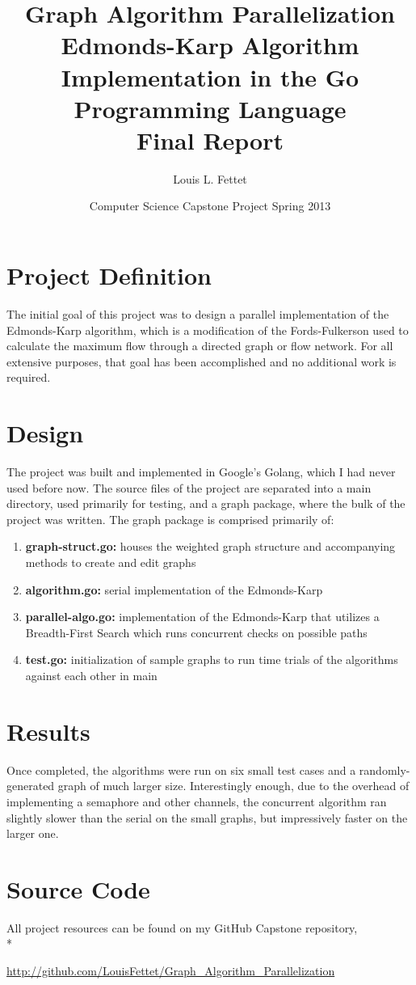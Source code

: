 \documentclass[12pt]{article}
\title{\textbf{Graph Algorithm Parallelization}\\ 
Edmonds-Karp Algorithm Implementation in the Go Programming Language\\ 
Final Report}
\date{Computer Science Capstone Project Spring 2013}
\author{Louis L. Fettet}
\begin{document}
\maketitle
\section{Project Definition}
The initial goal of this project was to design a parallel implementation of the Edmonds-Karp algorithm, which is a modification of the Fords-Fulkerson used to calculate the maximum flow through a directed graph or flow network.  For all extensive purposes, that goal has been accomplished and no additional work is required.
\section{Design}
\indent The project was built and implemented in Google's Golang, which I had never used before now.  The source files of the project are separated into a main directory, used primarily for testing, and a graph package, where the bulk of the project was written.  The graph package is comprised primarily of:
\begin {enumerate}
\item \textbf{graph-struct.go:} houses the weighted graph structure and accompanying methods to create and edit graphs
\item \textbf{algorithm.go:} serial implementation of the Edmonds-Karp
\item \textbf{parallel-algo.go:}  implementation of the Edmonds-Karp that utilizes a Breadth-First Search which runs concurrent checks on possible paths
\item \textbf{test.go:} initialization of sample graphs to run time trials of the algorithms against each other in main
\end {enumerate}
\section{Results}
\indent Once completed, the algorithms were run on six small test cases and a randomly-generated graph of much larger size.  Interestingly enough, due to the overhead of implementing a semaphore and other channels, the concurrent algorithm ran slightly slower than the serial on the small graphs, but impressively faster on the larger one.\\
\section{Source Code}
All project resources can be found on my GitHub Capstone repository,\\*
\centerline{\url{http://github.com/LouisFettet/Graph_Algorithm_Parallelization}}
\end{document}
